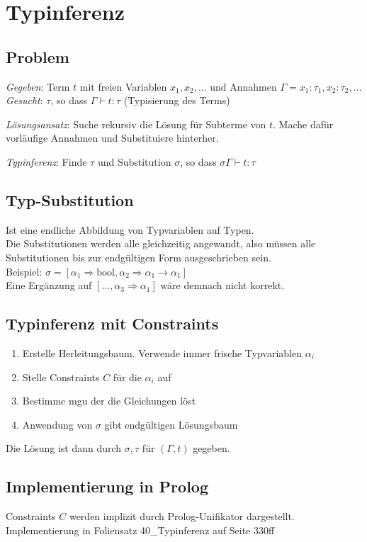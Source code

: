 

\section{Typinferenz}

\subsection{Problem}
\textit{Gegeben}: Term \(t\) mit freien Variablen \(x_1, x_2, \ldots\) und Annahmen \(\Gamma = x_1 : \tau_1, x_2 : \tau_2, \ldots\)\\
\textit{Gesucht}: \(\tau\), so dass \(\Gamma \vdash t: \tau\) (Typisierung des Terms)

\textit{Lösungsansatz}: Suche rekursiv die Lösung für Subterme von \(t\). Mache dafür vorläufige Annahmen und Substituiere hinterher.

\textit{Typinferenz}: Finde \(\tau\) und Substitution \(\sigma\), so dass \(\sigma \Gamma \vdash t: \tau\)

\subsection{Typ-Substitution}
Ist eine endliche Abbildung von Typvariablen auf Typen.\\
Die Substitutionen werden alle gleichzeitig angewandt, also müssen alle Substitutionen bis zur endgültigen Form
ausgeschrieben sein.\\
Beispiel: \(\sigma = [\alpha_1 \Rightarrow \text{bool}, \alpha_2 \Rightarrow \alpha_1 \rightarrow \alpha_1]\)\\
Eine Ergänzung auf \([\ldots, \alpha_3 \Rightarrow \alpha_1]\) wäre demnach nicht korrekt.

\subsection{Typinferenz mit Constraints}
\begin{enumerate}
  \item Erstelle Herleitungsbaum. Verwende immer frische Typvariablen \(\alpha_i\)
  \item Stelle Constraints \(C\) für die \(\alpha_i\) auf
  \item Bestimme mgu der die Gleichungen löst
  \item Anwendung von \(\sigma\) gibt endgültigen Lösungsbaum
\end{enumerate}
Die Lösung ist dann durch \(\sigma, \tau\) für \((\Gamma, t)\) gegeben.

\subsection{Implementierung in Prolog}
Constraints \(C\) werden implizit durch Prolog-Unifikator dargestellt.
Implementierung in Foliensatz 40\_Typinferenz auf Seite 330ff